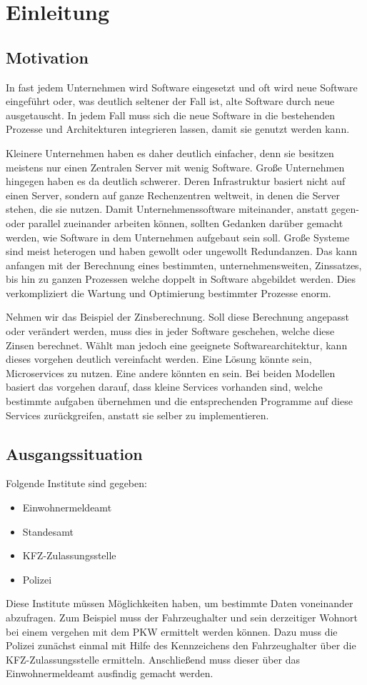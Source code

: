 \chapter{Einleitung}
\label{chap:einleitung}

\section{Motivation}
In fast jedem Unternehmen wird Software eingesetzt und oft wird neue Software eingeführt oder, was deutlich seltener der Fall ist, alte Software durch neue ausgetauscht. In jedem Fall muss sich die neue Software in die bestehenden Prozesse und Architekturen integrieren lassen, damit sie genutzt werden kann.

Kleinere Unternehmen haben es daher deutlich einfacher, denn sie besitzen meistens nur einen Zentralen Server mit wenig Software. Große Unternehmen hingegen haben es da deutlich schwerer. Deren Infrastruktur basiert nicht auf einen Server, sondern auf ganze Rechenzentren weltweit, in denen die Server stehen, die sie nutzen. Damit Unternehmenssoftware miteinander, anstatt gegen- oder parallel zueinander arbeiten können, sollten Gedanken darüber gemacht werden, wie Software in dem Unternehmen aufgebaut sein soll. Große Systeme sind meist heterogen und haben gewollt oder ungewollt Redundanzen. Das kann anfangen mit der Berechnung eines bestimmten, unternehmensweiten, Zinssatzes, bis hin zu ganzen Prozessen welche doppelt in Software abgebildet werden. Dies verkompliziert die Wartung und Optimierung bestimmter Prozesse enorm.

Nehmen wir das Beispiel der Zinsberechnung. Soll diese Berechnung angepasst oder verändert werden, muss dies in jeder Software geschehen, welche diese Zinsen berechnet. Wählt man jedoch eine geeignete Softwarearchitektur, kann dieses vorgehen deutlich vereinfacht werden. Eine Lösung könnte sein, Microservices zu nutzen. Eine andere könnten \SOA en sein. Bei beiden Modellen basiert das vorgehen darauf, dass kleine Services vorhanden sind, welche bestimmte aufgaben übernehmen und die entsprechenden Programme auf diese Services zurückgreifen, anstatt sie selber zu implementieren.

\section{Ausgangssituation}\label{sec:ausgangssituation}
Folgende Institute sind gegeben:
\begin{itemize}
    \item Einwohnermeldeamt
    \item Standesamt
    \item KFZ-Zulassungsstelle
    \item Polizei
\end{itemize}
Diese Institute müssen Möglichkeiten haben, um bestimmte Daten voneinander abzufragen. Zum Beispiel muss der Fahrzeughalter und sein derzeitiger Wohnort bei einem vergehen mit dem PKW ermittelt werden können. Dazu muss die Polizei zunächst einmal mit Hilfe des Kennzeichens den Fahrzeughalter über die KFZ-Zulassungsstelle ermitteln. Anschließend muss dieser über das Einwohnermeldeamt ausfindig gemacht werden.

